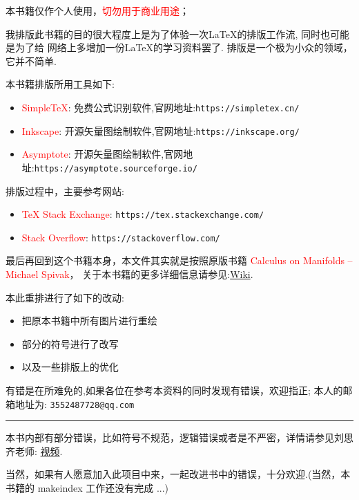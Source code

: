 \documentclass{article}
\newcommand{\red}[1]{\textcolor{red}{#1}}
\begin{document}
\thispagestyle{empty}
本书籍仅作个人使用，\red{切勿用于商业用途}；

我排版此书籍的目的很大程度上是为了体验一次\LaTeX{}的排版工作流, 同时也可能是为了给
网络上多增加一份\LaTeX{}的学习资料罢了. 排版是一个极为小众的领域，它并不简单.


本书籍排版所用工具如下:
\begin{itemize}
    \item \red{Simple\TeX{}}: 免费公式识别软件,官网地址:\verb|https://simpletex.cn/|
    \item \red{Inkscape}: 开源矢量图绘制软件,官网地址:\verb|https://inkscape.org/|
    \item \red{Asymptote}: 开源矢量图绘制软件,官网地址:\verb|https://asymptote.sourceforge.io/|
\end{itemize}

排版过程中，主要参考网站:
\begin{itemize}
    \item \red{\TeX{} Stack Exchange}: \verb|https://tex.stackexchange.com/|
    \item \red{Stack Overflow}: \verb|https://stackoverflow.com/|
\end{itemize}

最后再回到这个书籍本身，本文件其实就是按照原版书籍 \red{Calculus on Manifolds -- Michael Spivak}，
关于本书籍的更多详细信息请参见:\href{https://en.wikipedia.org/wiki/Calculus\_on\_Manifolds\_(book)}{Wiki}.

本此重排进行了如下的改动:
\begin{itemize}
    \item 把原本书籍中所有图片进行重绘
    \item 部分的符号进行了改写
    \item 以及一些排版上的优化
\end{itemize}

有错是在所难免的,如果各位在参考本资料的同时发现有错误，欢迎指正; 
本人的邮箱地址为: \verb|3552487728@qq.com|

\vspace*{2em}
\noindent\rule{1\linewidth}{3pt}\par
本书内部有部分错误，比如符号不规范，逻辑错误或者是不严密，详情请参见刘思齐老师:
\href{https://www.bilibili.com/video/BV1xp4y1e7Nh/?share\_source=copy\_web\&vd\_source=a9d745bfbf443d7fec13113cdd89ee46}{视频}.

当然，如果有人愿意加入此项目中来，一起改进书中的错误，十分欢迎.(当然，本书籍的 makeindex 工作还没有完成 ...)
\end{document}
